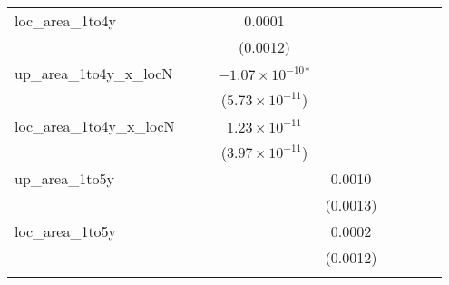 \begin{tabular}{lcccccccc}
   loc\_area\_1to4y              &                          &                          & 0.0001                        &                               &                             &                          &                          &   \\   
                                 &                          &                          & (0.0012)                      &                               &                             &                          &                          &   \\   
   up\_area\_1to4y\_x\_locN      &                          &                          & $-1.07\times 10^{-10}$$^{*}$  &                               &                             &                          &                          &   \\   
                                 &                          &                          & ($5.73\times 10^{-11}$)       &                               &                             &                          &                          &   \\   
   loc\_area\_1to4y\_x\_locN     &                          &                          & $1.23\times 10^{-11}$         &                               &                             &                          &                          &   \\   
                                 &                          &                          & ($3.97\times 10^{-11}$)       &                               &                             &                          &                          &   \\   
   up\_area\_1to5y               &                          &                          &                               & 0.0010                        &                             &                          &                          &   \\   
                                 &                          &                          &                               & (0.0013)                      &                             &                          &                          &   \\   
   loc\_area\_1to5y              &                          &                          &                               & 0.0002                        &                             &                          &                          &   \\   
                                 &                          &                          &                               & (0.0012)                      &                             &                          &                          &   \\   
$$
\end{tabular}
